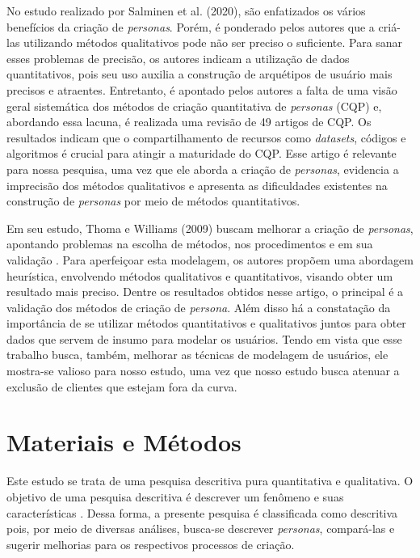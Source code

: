\documentclass[12pt]{article}
\begin{document}
\par No estudo realizado por Salminen et al. (2020)\cite{10.1145/3313831.3376502}, são enfatizados os vários benefícios da criação de \emph{personas}. Porém, é ponderado pelos autores que a criá-las utilizando métodos qualitativos pode não ser preciso o suficiente. Para sanar esses problemas de precisão, os autores indicam a utilização de dados quantitativos, pois seu uso auxilia a construção de arquétipos de usuário mais precisos e atraentes. Entretanto, é apontado pelos autores a falta de uma visão geral sistemática dos métodos de criação quantitativa de \emph{personas} (CQP) e, abordando essa lacuna, é realizada uma revisão de 49 artigos de CQP. Os resultados indicam que o compartilhamento de recursos como \emph{datasets}, códigos e algoritmos é crucial para atingir a maturidade do CQP. Esse artigo é relevante para nossa pesquisa, uma vez que ele aborda a criação de \emph{personas}, evidencia a imprecisão dos métodos qualitativos e apresenta as dificuldades existentes na construção de \emph{personas} por meio de métodos quantitativos.

\par Em seu estudo, Thoma e Williams (2009) buscam melhorar a criação de \emph{personas}, apontando problemas na escolha de métodos, nos procedimentos e em sua validação \cite{10.1007/978-3-642-03658-3_56}. Para aperfeiçoar esta modelagem, os autores propõem uma abordagem heurística, envolvendo métodos qualitativos e quantitativos, visando obter um resultado mais preciso. Dentre os resultados obtidos nesse artigo, o principal é a validação dos métodos de criação de \emph{persona}. Além disso há a constatação da importância de se utilizar métodos quantitativos e qualitativos juntos para obter dados que servem de insumo para modelar os usuários. Tendo em vista que esse trabalho busca, também, melhorar as técnicas de modelagem de usuários, ele mostra-se valioso para nosso estudo, uma vez que nosso estudo busca atenuar a exclusão de clientes que estejam fora da curva.

\section{Materiais e Métodos} \label{sec:materiaisemetodos}
Este estudo se trata de uma pesquisa descritiva pura quantitativa e qualitativa. O objetivo de uma pesquisa descritiva é descrever um fenômeno e suas características \cite{10.1177/1362168815572747}. Dessa forma, a presente pesquisa é classificada como descritiva pois, por meio de diversas análises, busca-se descrever \emph{personas}, compará-las e sugerir melhorias para os respectivos processos de criação.
\end{document}
